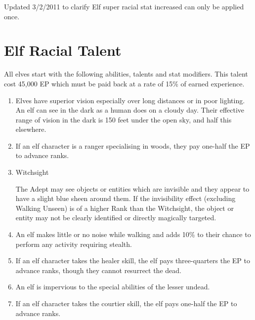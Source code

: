 \documentclass[a4paper]{article}
\begin{document}
\begin{multicols*}{3}

Updated 3/2/2011 to clarify Elf super racial stat increased can only
be applied once.

\section{Elf Racial Talent}

All elves start with the following abilities, talents and stat
modifiers.  This talent cost 45,000 EP which must be paid back at a
rate of 15\% of earned experience.
				   
\begin{enumerate}
\item
Elves have superior vision especially over long distances or in poor
lighting.  An elf can see in the dark as a human does on a cloudy
day. Their effective range of vision in the dark is 150 feet under the
open sky, and half this elsewhere.

\item
If an elf character is a ranger specialising in woods, they pay
one-half the EP to advance ranks.

\item
\begin{talent}{Witchsight}
\begin{effects}
The Adept may see objects or entities which are invisible and they
appear to have a slight blue sheen around them. If the invisibility
effect (excluding Walking Unseen) is of a higher Rank than the
Witchsight, the object or entity may not be clearly identified or
directly magically targeted.
\end{effects}
\end{talent}

\item
An elf makes little or no noise while walking and adds 10\% to their
chance to perform any activity requiring stealth.

\item
If an elf character takes the healer skill, the elf pays
three-quarters the EP to advance ranks, though they cannot resurrect
the dead.

\item
An elf is impervious to the special abilities of the lesser undead.

\item
If an elf character takes the courtier skill, the elf pays one-half
the EP to advance ranks.
\end{enumerate}


\end{multicols*}
\end{document}
